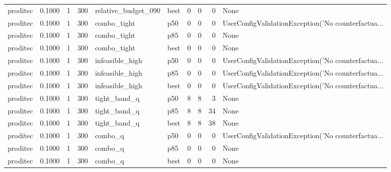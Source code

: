 \begin{tabular}{lrrrllrrrl}
proditec &    0.1000 &    1 &    300 &  relative\_budget\_090 &   best &               0 &          0 &       0 &                                               None \\
proditec &    0.1000 &    1 &    300 &          combo\_tight &    p50 &               0 &          0 &       0 & UserConfigValidationException('No counterfactua... \\
proditec &    0.1000 &    1 &    300 &          combo\_tight &    p85 &               0 &          0 &       0 &                                               None \\
proditec &    0.1000 &    1 &    300 &          combo\_tight &   best &               0 &          0 &       0 &                                               None \\
proditec &    0.1000 &    1 &    300 &      infeasible\_high &    p50 &               0 &          0 &       0 & UserConfigValidationException('No counterfactua... \\
proditec &    0.1000 &    1 &    300 &      infeasible\_high &    p85 &               0 &          0 &       0 & UserConfigValidationException('No counterfactua... \\
proditec &    0.1000 &    1 &    300 &      infeasible\_high &   best &               0 &          0 &       0 & UserConfigValidationException('No counterfactua... \\
proditec &    0.1000 &    1 &    300 &         tight\_band\_q &    p50 &               8 &          8 &       3 &                                               None \\
proditec &    0.1000 &    1 &    300 &         tight\_band\_q &    p85 &               8 &          8 &      34 &                                               None \\
proditec &    0.1000 &    1 &    300 &         tight\_band\_q &   best &               8 &          8 &      38 &                                               None \\
proditec &    0.1000 &    1 &    300 &              combo\_q &    p50 &               0 &          0 &       0 & UserConfigValidationException('No counterfactua... \\
proditec &    0.1000 &    1 &    300 &              combo\_q &    p85 &               0 &          0 &       0 &                                               None \\
proditec &    0.1000 &    1 &    300 &              combo\_q &   best &               0 &          0 &       0 &                                               None \\

\end{tabular}
